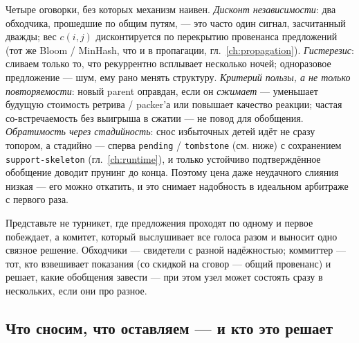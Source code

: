 Четыре оговорки, без которых механизм наивен. \emph{Дисконт независимости}:
два обходчика, прошедшие по общим путям, --- это часто один сигнал,
засчитанный дважды; вес $c(i,j)$ дисконтируется по перекрытию провенанса
предложений (тот же Bloom / MinHash, что и в пропагации,
гл.~\ref{ch:propagation}). \emph{Гистерезис}: сливаем только то, что
рекуррентно всплывает несколько ночей; одноразовое предложение --- шум, ему
рано менять структуру. \emph{Критерий пользы, а не только повторяемости}:
новый parent оправдан, если он \emph{сжимает} --- уменьшает будущую стоимость
ретрива / packer'а или повышает качество реакции; частая со-встречаемость без
выигрыша в сжатии --- не повод для обобщения. \emph{Обратимость через
стадийность}: снос избыточных детей идёт не сразу топором, а стадийно ---
сперва \texttt{pending} / \texttt{tombstone} (см. ниже) с сохранением
\texttt{support-skeleton} (гл.~\ref{ch:runtime}), и только устойчиво
подтверждённое обобщение доводит прунинг до конца. Поэтому цена даже
неудачного слияния низкая --- его можно откатить, и это снимает надобность в
идеальном арбитраже с первого раза.

\begin{intuition}
Представьте не турникет, где предложения проходят по одному и первое
побеждает, а комитет, который выслушивает все голоса разом и выносит одно
связное решение. Обходчики --- свидетели с разной надёжностью; коммиттер ---
тот, кто взвешивает показания (со скидкой на сговор --- общий провенанс) и
решает, какие обобщения завести --- при этом узел может состоять сразу в
нескольких, если они про разное.
\end{intuition}

\subsection{Что сносим, что оставляем --- и кто это решает}
\label{sec:consolidation-prune}

